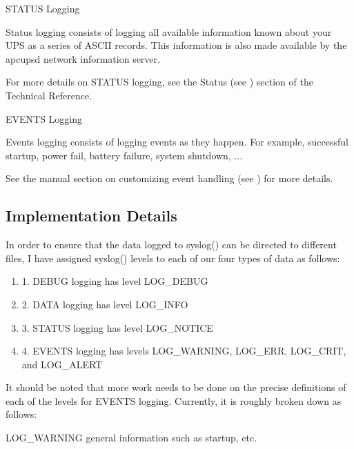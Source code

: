 {{{{{{{\small{STATUS Logging}

Status logging consists of logging all available information known about your
UPS as a series of ASCII records. This information is also made available by
the apcupsd network information server.  

For more details on STATUS logging, see the Status (see 
) section of
the Technical Reference. 

\small{EVENTS Logging}

Events logging consists of logging events as they happen. For example,
successful startup, power fail, battery failure, system shutdown, ...  

See the manual section on customizing event handling (see 
) for
more details. 

\label{Implementation-Details}

\subsection*{Implementation Details}

In order to ensure that the data logged to syslog() can be directed to
different files, I have assigned syslog() levels to each of our four types of
data as follows:  

\begin{enumerate}
\item 1. DEBUG logging has level LOG\_DEBUG  
\item 2. DATA logging has level LOG\_INFO  
\item 3. STATUS logging has level LOG\_NOTICE  
\item 4. EVENTS logging has levels LOG\_WARNING, LOG\_ERR, LOG\_CRIT, and
   LOG\_ALERT  
   \end{enumerate}

It should be noted that more work needs to be done on the precise definitions
of each of the levels for EVENTS logging. Currently, it is roughly broken down
as follows:  

LOG\_WARNING general information such as startup, etc.  

}}}}}}}
